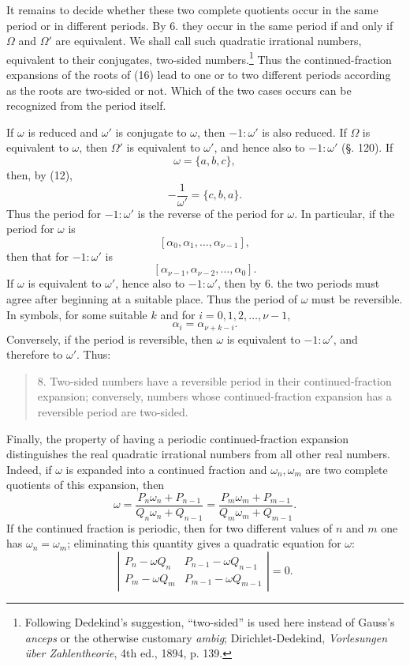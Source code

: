 \documentclass[11pt]{article}
\begin{document}
It remains to decide whether these two complete quotients occur in the same period or in different periods. By 6. they occur in the same period if and only if $\Omega$ and $\Omega'$ are equivalent. We shall call such quadratic irrational numbers, equivalent to their conjugates, two-sided numbers.\footnote{Following Dedekind's suggestion, ``two-sided'' is used here instead of Gauss's \emph{anceps} or the otherwise customary \emph{ambig}; Dirichlet-Dedekind, \emph{Vorlesungen über Zahlentheorie}, 4th ed., 1894, p. 139.} Thus the continued-fraction expansions of the roots of (16) lead to one or to two different periods according as the roots are two-sided or not. Which of the two cases occurs can be recognized from the period itself.

If $\omega$ is reduced and $\omega'$ is conjugate to $\omega$, then $-1:\omega'$ is also reduced. If $\Omega$ is equivalent to $\omega$, then $\Omega'$ is equivalent to $\omega'$, and hence also to $-1:\omega'$ (§. 120). If
\[
        \omega=\{a,b,c\},
\]
then, by (12),
\[
        -\frac1{\omega'}=\{c,b,a\}.
\]
Thus the period for $-1:\omega'$ is the reverse of the period for $\omega$. In particular, if the period for $\omega$ is
\[
\tag{17}       [\alpha_0,\alpha_1,\ldots,\alpha_{\nu-1}],
\]
then that for $-1:\omega'$ is
\[
\tag{18}       [\alpha_{\nu-1},\alpha_{\nu-2},\ldots,\alpha_0].
\]
If $\omega$ is equivalent to $\omega'$, hence also to $-1:\omega'$, then by 6. the two periods must agree after beginning at a suitable place. Thus the period of $\omega$ must be reversible. In symbols, for some suitable $k$ and for $i=0,1,2,\ldots,\nu-1$,
\[
        \alpha_i=\alpha_{\nu+k-i}.
\]
Conversely, if the period is reversible, then $\omega$ is equivalent to $-1:\omega'$, and therefore to $\omega'$. Thus:
\begin{quote}
8. Two-sided numbers have a reversible period in their continued-fraction expansion; conversely, numbers whose continued-fraction expansion has a reversible period are two-sided.
\end{quote}

Finally, the property of having a periodic continued-fraction expansion distinguishes the real quadratic irrational numbers from all other real numbers. Indeed, if $\omega$ is expanded into a continued fraction and $\omega_n,\omega_m$ are two complete quotients of this expansion, then
\[
        \omega=
\frac{P_n\omega_n+P_{n-1}}{Q_n\omega_n+Q_{n-1}}
=\frac{P_m\omega_m+P_{m-1}}{Q_m\omega_m+Q_{m-1}}.
\]
If the continued fraction is periodic, then for two different values of $n$ and $m$ one has $\omega_n=\omega_m$; eliminating this quantity gives a quadratic equation for $\omega$:
\[
        \left|
        \begin{array}{cc}
        P_n-\omega Q_n & P_{n-1}-\omega Q_{n-1}\\
        P_m-\omega Q_m & P_{m-1}-\omega Q_{m-1}
        \end{array}\right|=0.
\]
\end{document}
